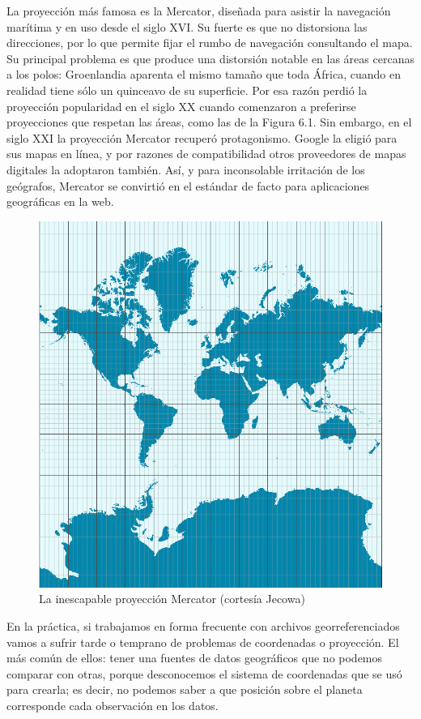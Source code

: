 \documentclass[spanish,]{book}
\begin{document}
La proyección más famosa es la Mercator, diseñada para asistir la navegación marítima y en uso desde el siglo XVI. Su fuerte es que no distorsiona las direcciones, por lo que permite fijar el rumbo de navegación consultando el mapa. Su principal problema es que produce una distorsión notable en las áreas cercanas a los polos: Groenlandia aparenta el mismo tamaño que toda África, cuando en realidad tiene sólo un quinceavo de su superficie. Por esa razón perdió la proyección popularidad en el siglo XX cuando comenzaron a preferirse proyecciones que respetan las áreas, como las de la Figura 6.1. Sin embargo, en el siglo XXI la proyección Mercator recuperó protagonismo. Google la eligió para sus mapas en línea, y por razones de compatibilidad otros proveedores de mapas digitales la adoptaron también. Así, y para inconsolable irritación de los geógrafos, Mercator se convirtió en el estándar de facto para aplicaciones geográficas en la web.

\begin{figure}
\includegraphics[width=1\linewidth]{imagenes/Mercator-proj} \caption{La inescapable proyección Mercator (cortesía Jecowa)}\label{fig:unnamed-chunk-144}
\end{figure}

En la práctica, si trabajamos en forma frecuente con archivos georreferenciados vamos a sufrir tarde o temprano de problemas de coordenadas o proyección. El más común de ellos: tener una fuentes de datos geográficos que no podemos comparar con otras, porque desconocemos el sistema de coordenadas que se usó para crearla; es decir, no podemos saber a que posición sobre el planeta corresponde cada observación en los datos.
\end{document}
